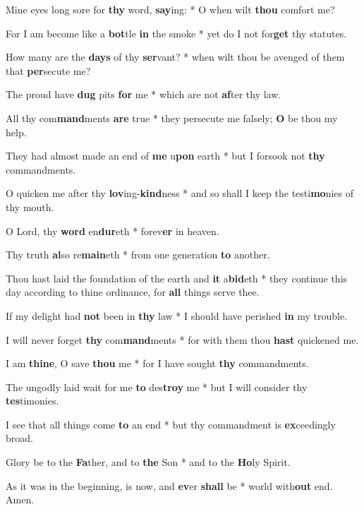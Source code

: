 \begin{multicols}{2}
	Mine eyes long sore for \textbf{thy} word, \textbf{say}ing: * O when wilt \textbf{thou} comfort me?
	
	For I am become like a \textbf{bot}tle \textbf{in} the smoke * yet do I not for\textbf{get} thy statutes.
	
	How many are the \textbf{days} of thy \textbf{ser}vant? * when wilt thou be avenged of them that \textbf{per}secute me?
	
	The proud have \textbf{dug} pits \textbf{for} me * which are not \textbf{af}ter thy law.
	
	All thy com\textbf{mand}ments \textbf{are} true * they persecute me falsely; \textbf{O} be thou my help.
	
	They had almost made an end of \textbf{me} u\textbf{pon} earth * but I forsook not \textbf{thy} commandments.
	
	O quicken me after thy \textbf{lov}ing-\textbf{kind}ness * and so shall I keep the testi\textbf{mo}nies of thy mouth.
	
	O Lord, thy \textbf{word} en\textbf{dur}eth * forev\textbf{er} in heaven.
	
	Thy truth \textbf{al}so re\textbf{main}eth * from one generation \textbf{to} another.
	
	Thou hast laid the foundation of the earth and \textbf{it} a\textbf{bid}eth * they continue this day according to thine ordinance, for \textbf{all} things serve thee.
	
	If my delight had \textbf{not} been in \textbf{thy} law * I should have perished \textbf{in} my trouble.
	
	I will never forget \textbf{thy} com\textbf{mand}ments * for with them thou \textbf{hast} quickened me.
	
	I am \textbf{thine}, O save \textbf{thou} me * for I have sought \textbf{thy} commandments.
	
	The ungodly laid wait for me \textbf{to} des\textbf{troy} me * but I will consider thy \textbf{tes}timonies.
	
	I see that all things come \textbf{to} an end * but thy commandment is \textbf{ex}ceedingly broad.
	
	Glory be to the \textbf{Fa}ther, and to \textbf{the} Son * and to the \textbf{Ho}ly Spirit.
	
	As it was in the beginning, is now, and \textbf{ev}er \textbf{shall} be * world with\textbf{out} end. Amen.
\end{multicols}